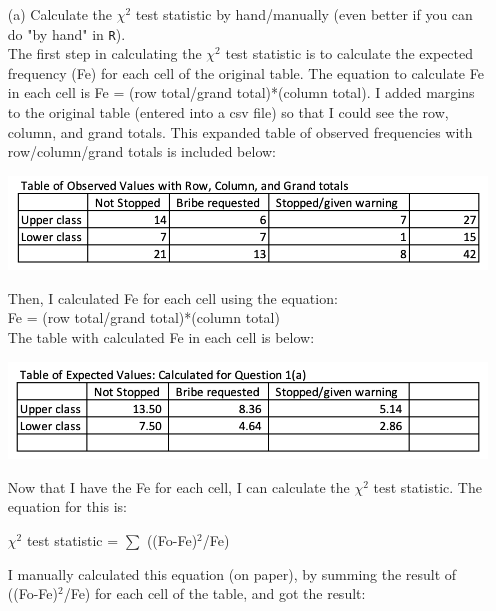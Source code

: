 \documentclass[12pt,letterpaper]{article}
\begin{document}
\begin{enumerate}
	
	
	
	\item [(a)]
	Calculate the $\chi^2$ test statistic by hand/manually (even better if you can do "by hand" in \texttt{R}).\\
	
	The first step in calculating  the $\chi^2$ test statistic is to calculate the expected frequency (Fe) for each cell of the original table.  The equation to calculate Fe in each cell is Fe = (row total/grand total)*(column total). I added margins to the original table (entered into a csv file) so that I could see the row, column, and grand totals. This expanded table of observed frequencies with row/column/grand totals is included  below:
	
	\begin{center}	
		\includegraphics[scale=.90]{FoTableTotals.png}\\
	\end{center}
	
	Then, I calculated Fe for each cell using the equation:\\
	 Fe = (row total/grand total)*(column total)\\
	 
	 The table with calculated Fe in each cell is below:
	
	\begin{center}	
	\includegraphics[scale=.90]{FeTable.png}\\
	\end{center}
	 
	Now that I have the Fe for each cell, I can calculate the $\chi^2$ test statistic.  The equation for this is:
	
	$\chi^2$ test statistic = $\sum$ ((Fo-Fe)$^2$/Fe)
	
	I manually calculated this equation (on paper), by summing the result of ((Fo-Fe)$^2$/Fe) for each cell of the table, and got the result:
	

\end{enumerate}
\end{document}
